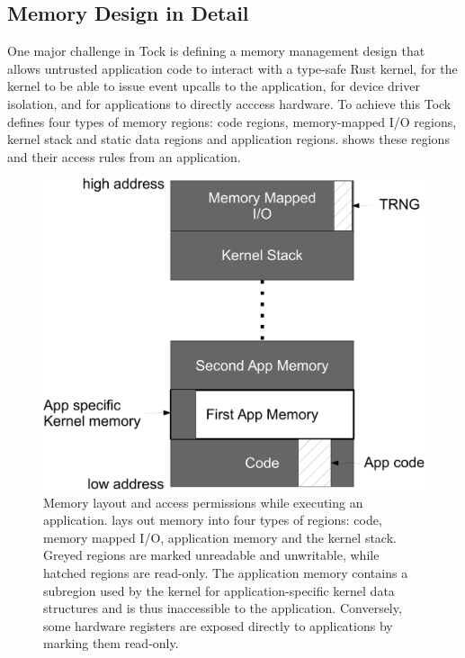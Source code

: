 \subsection{\name Memory Design in Detail}
\label{sec:arch:memory-design}

One major challenge in Tock is defining a memory management design
that allows untrusted application code 
to interact with a type-safe Rust kernel, for the kernel to be able to
issue event upcalls to the application, for device driver isolation, and 
for applications to directly
acccess hardware. To achieve this
Tock defines four types of memory regions: code regions, 
memory-mapped I/O regions,
kernel stack and static data regions and application regions.
 shows these regions and their access rules from
an application.

\begin{figure}
 \centering
\includegraphics[width=1\columnwidth]{img/memory-layout-crop}
\caption{Memory layout and access permissions while executing an application.
\name lays out memory into four types of regions: code, memory mapped I/O,
application memory and the kernel stack. Greyed regions are marked unreadable
and unwritable, while hatched regions are read-only. The application memory
contains a subregion used by the kernel for application-specific kernel data
structures and is thus inaccessible to the application. Conversely, some
hardware registers are exposed directly to applications by marking them
read-only.}
 \label{fig:memory-layout}
\end{figure}



